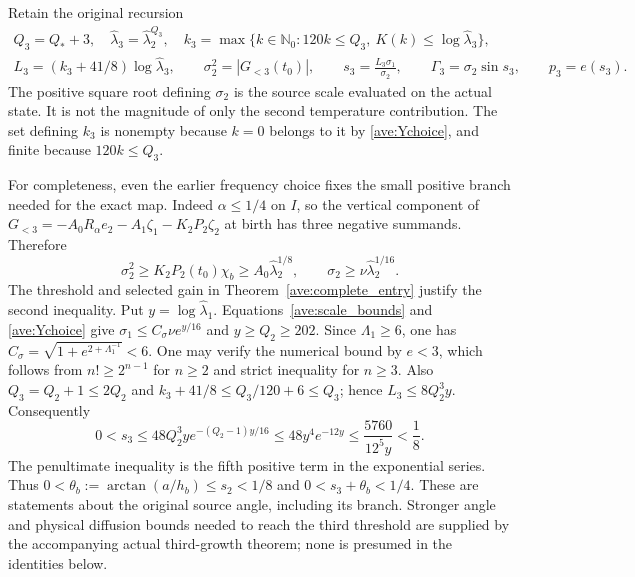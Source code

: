 Retain the original recursion
\begin{equation}\label{tg:third_design}
 \begin{gathered}
 Q_3=Q_*+3,\quad
 \widehat\lambda_3=\widehat\lambda_2^{Q_3},\quad
 k_3=\max\{k\in\mathbb N_0:120k\leq Q_3,
                  \ K(k)\leq\log\widehat\lambda_3\},\\
 L_3=(k_3+41/8)\log\widehat\lambda_3,\qquad
 \sigma_2^2=|G_{<3}(t_0)|,\qquad
 s_3=\frac{L_3\sigma_1}{\sigma_2},\qquad
 \Gamma_3=\sigma_2\sin s_3,\qquad p_3=e(s_3).
 \end{gathered}
\end{equation}
The positive square root defining $\sigma_2$ is the source scale
evaluated on the actual state. It is not the magnitude of only the
second temperature contribution. The set defining $k_3$ is nonempty
because $k=0$ belongs to it by \eqref{ave:Ychoice}, and finite because
$120k\leq Q_3$.

For completeness, even the earlier frequency choice fixes the small
positive branch needed for the exact map. Indeed $\alpha\leq1/4$
on $I$, so the vertical component of
$G_{<3}=-A_0R_\alpha e_2-A_1\zeta_1-K_2P_2\zeta_2$
at birth has three negative summands. Therefore
\[
 \sigma_2^2\geq K_2P_2(t_0)\chi_b
 \geq A_0\widehat\lambda_2^{1/8},\qquad
 \sigma_2\geq\nu\widehat\lambda_2^{1/16}.
\]
The threshold and selected gain in Theorem~\ref{ave:complete_entry}
justify the second inequality. Put $y=\log\widehat\lambda_1$.
Equations~\eqref{ave:scale_bounds} and \eqref{ave:Ychoice} give
$\sigma_1\leq C_\sigma\nu e^{y/16}$ and $y\geq Q_2\geq202$.
Since $\Lambda_1\geq6$, one has
$C_\sigma=\sqrt{1+e^{2+\Lambda_1^{-1}}}<6$.
One may verify the numerical bound by $e<3$, which follows from
$n!\geq2^{n-1}$ for $n\geq2$ and strict inequality for $n\geq3$.
Also $Q_3=Q_2+1\leq2Q_2$ and
$k_3+41/8\leq Q_3/120+6\leq Q_3$; hence
$L_3\leq8Q_2^3y$. Consequently
\begin{equation}\label{tg:birth_angle}
 0<s_3\leq48Q_2^3y e^{-(Q_2-1)y/16}
 \leq48y^4e^{-12y}
 \leq\frac{5760}{12^5y}<\frac18.
\end{equation}
The penultimate inequality is the fifth positive term in the
exponential series. Thus $0<\theta_b:=\arctan(a/h_b)\leq s_2<1/8$
and $0<s_3+\theta_b<1/4$. These are statements about the original
source angle, including its branch. Stronger angle and physical
diffusion bounds needed to reach the third threshold are supplied
by the accompanying actual third-growth theorem; none is presumed
in the identities below.

